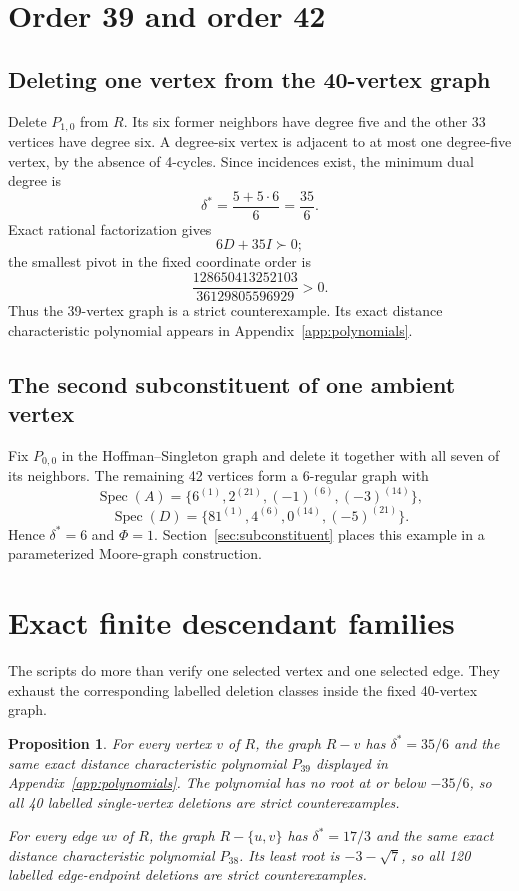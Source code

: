 \documentclass[11pt,reqno]{amsart}
\newcommand{\Spec}{\operatorname{Spec}}
\newcommand{\PhiScore}{\Phi}
\theoremstyle{plain}
\newtheorem{proposition}[theorem]{Proposition}
\theoremstyle{definition}
\theoremstyle{remark}
\begin{document}
\section{Order 39 and order 42}

\subsection{Deleting one vertex from the 40-vertex graph}
Delete $P_{1,0}$ from $R$.  Its six former neighbors have degree five and the
other 33 vertices have degree six.  A degree-six vertex is adjacent to at
most one degree-five vertex, by the absence of 4-cycles.  Since incidences
exist, the minimum dual degree is
\[
 \delta^*=\frac{5+5\cdot6}{6}=\frac{35}{6}.
\]
Exact rational factorization gives
\[
 6D+35I\succ0;
\]
the smallest pivot in the fixed coordinate order is
\[
 \frac{128650413252103}{36129805596929}>0.
\]
Thus the 39-vertex graph is a strict counterexample.  Its exact distance
characteristic polynomial appears in Appendix~\ref{app:polynomials}.

\subsection{The second subconstituent of one ambient vertex}
Fix $P_{0,0}$ in the Hoffman--Singleton graph and delete it together with all
seven of its neighbors.  The remaining 42 vertices form a 6-regular graph
with
\[
 \Spec(A)=\{6^{(1)},2^{(21)},(-1)^{(6)},(-3)^{(14)}\},
\]
\[
 \Spec(D)=\{81^{(1)},4^{(6)},0^{(14)},(-5)^{(21)}\}.
\]
Hence $\delta^*=6$ and $\PhiScore=1$.  Section~\ref{sec:subconstituent}
places this example in a parameterized Moore-graph construction.

\section{Exact finite descendant families}

The scripts do more than verify one selected vertex and one selected edge.
They exhaust the corresponding labelled deletion classes inside the fixed
40-vertex graph.

\begin{proposition}\label{prop:descendants}
For every vertex $v$ of $R$, the graph $R-v$ has
$\delta^*=35/6$ and the same exact distance characteristic polynomial
$P_{39}$ displayed in Appendix~\ref{app:polynomials}.  The polynomial has no
root at or below $-35/6$, so all 40 labelled single-vertex deletions are strict
counterexamples.

For every edge $uv$ of $R$, the graph $R-\{u,v\}$ has
$\delta^*=17/3$ and the same exact distance characteristic polynomial
$P_{38}$.  Its least root is $-3-\sqrt7$, so all 120 labelled edge-endpoint
deletions are strict counterexamples.
\end{proposition}
\end{document}
